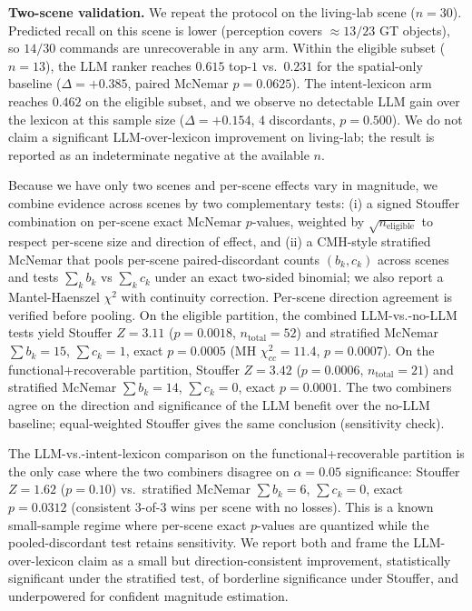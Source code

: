 \noindent\textbf{Two-scene validation.}
We repeat the protocol on the living-lab scene ($n=30$). Predicted
recall on this scene is lower (perception covers $\approx 13/23$ GT
objects), so $14/30$ commands are unrecoverable in any arm. Within
the eligible subset ($n=13$), the LLM ranker reaches
$0.615$ top-$1$ vs.\ $0.231$ for the spatial-only baseline
($\Delta=+0.385$, paired McNemar $p=0.0625$). The intent-lexicon
arm reaches $0.462$ on the eligible subset, and we observe no
detectable LLM gain over the lexicon at this sample size
($\Delta=+0.154$, $4$ discordants, $p=0.500$). We do not claim a
significant LLM-over-lexicon improvement on living-lab; the result
is reported as an indeterminate negative at the available $n$.

Because we have only two scenes and per-scene effects vary in
magnitude, we combine evidence across scenes by two complementary
tests: (i) a signed Stouffer combination on per-scene exact McNemar
$p$-values, weighted by $\sqrt{n_{\mathrm{eligible}}}$ to respect
per-scene size and direction of effect, and (ii) a CMH-style
stratified McNemar that pools per-scene paired-discordant counts
$(b_k, c_k)$ across scenes and tests $\sum_k b_k$ vs $\sum_k c_k$
under an exact two-sided binomial; we also report a Mantel-Haenszel
$\chi^2$ with continuity correction. Per-scene direction agreement
is verified before pooling. On the eligible partition, the combined
LLM-vs.-no-LLM tests yield Stouffer $Z=3.11$ ($p=0.0018$,
$n_{\mathrm{total}}=52$) and stratified McNemar
$\sum b_k = 15$, $\sum c_k = 1$, exact $p=0.0005$
(MH $\chi^2_{cc}=11.4$, $p=0.0007$). On the functional+recoverable
partition, Stouffer $Z=3.42$ ($p=0.0006$, $n_{\mathrm{total}}=21$)
and stratified McNemar $\sum b_k = 14$, $\sum c_k = 0$, exact
$p=0.0001$. The two combiners agree on the direction and significance
of the LLM benefit over the no-LLM baseline; equal-weighted Stouffer
gives the same conclusion (sensitivity check).

The LLM-vs.-intent-lexicon comparison on the
functional+recoverable partition is the only case where the two
combiners disagree on $\alpha=0.05$ significance: Stouffer
$Z=1.62$ ($p=0.10$) vs.\ stratified McNemar
$\sum b_k = 6$, $\sum c_k = 0$, exact $p=0.0312$ (consistent
$3$-of-$3$ wins per scene with no losses). This is a known
small-sample regime where per-scene exact $p$-values are
quantized while the pooled-discordant test retains sensitivity. We
report both and frame the LLM-over-lexicon claim as a small but
direction-consistent improvement, statistically significant under
the stratified test, of borderline significance under Stouffer, and
underpowered for confident magnitude estimation.

